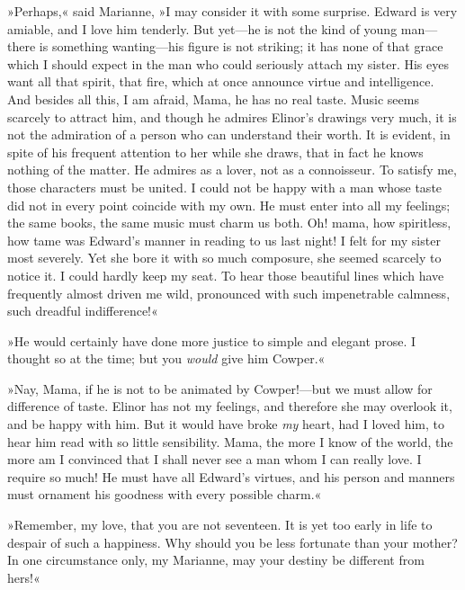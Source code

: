»Perhaps,« said Marianne, »I may consider it with some surprise. Edward is very amiable, and I love him tenderly. But yet—he is not the kind of young man—there is something wanting—his figure is not striking; it has none of that grace which I should expect in the man who could seriously attach my sister. His eyes want all that spirit, that fire, which at once announce virtue and intelligence. And besides all this, I am afraid, Mama, he has no real taste. Music seems scarcely to attract him, and though he admires Elinor’s drawings very much, it is not the admiration of a person who can understand their worth. It is evident, in spite of his frequent attention to her while she draws, that in fact he knows nothing of the matter. He admires as a lover, not as a connoisseur. To satisfy me, those characters must be united. I could not be happy with a man whose taste did not in every point coincide with my own. He must enter into all my feelings; the same books, the same music must charm us both. Oh! mama, how spiritless, how tame was Edward’s manner in reading to us last night! I felt for my sister most severely. Yet she bore it with so much composure, she seemed scarcely to notice it. I could hardly keep my seat. To hear those beautiful lines which have frequently almost driven me wild, pronounced with such impenetrable calmness, such dreadful indifference!«

»He would certainly have done more justice to simple and elegant prose. I thought so at the time; but you \textit{would} give him Cowper.«

»Nay, Mama, if he is not to be animated by Cowper!—but we must allow for difference of taste. Elinor has not my feelings, and therefore she may overlook it, and be happy with him. But it would have broke \textit{my} heart, had I loved him, to hear him read with so little sensibility. Mama, the more I know of the world, the more am I convinced that I shall never see a man whom I can really love. I require so much! He must have all Edward’s virtues, and his person and manners must ornament his goodness with every possible charm.«

»Remember, my love, that you are not seventeen. It is yet too early in life to despair of such a happiness. Why should you be less fortunate than your mother? In one circumstance only, my Marianne, may your destiny be different from hers!«

